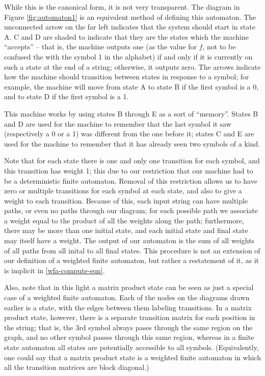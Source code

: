 \documentclass[12pt]{amsbook}
\theoremstyle{plain}
\theoremstyle{definition}
\theoremstyle{remark}
\begin{document}
While this is the canonical form, it is not very transparent.  The diagram in Figure \ref{fig:automaton1} is an equivalent method of defining this automaton.  The unconnected arrow on the far left indicates that the system should start in state A.  C and D are shaded to indicate that they are the states which the machine ``accepts'' -- that is, the machine outputs one (as the value for $f$, not to be confused the with the symbol 1 in the alphabet) if and only if it is currently on such a state at the end of a string;  otherwise, it outputs zero.  The arrows indicate how the machine should transition between states in response to a symbol;  for example, the machine will move from state A to state B if the first symbol is a 0, and to state D if the first symbol is a 1.

This machine works by using states B through E as a sort of ``memory''.  States B and D are used for the machine to remember that the last symbol it saw (respectively a 0 or a 1) was different from the one before it;  states C and E are used for the machine to remember that it has already seen two symbols of a kind.

Note that for each state there is one and only one transition for each symbol, and this transition has weight 1;  this due to our restriction that our machine had to be a deterministic finite automaton.  Removal of this restriction allows us to have zero or multiple transitions for each symbol at each state, and also to give a weight to each transition.  Because of this, each input string can have multiple paths, or even no paths through our diagram;  for each possible path we associate a weight equal to the product of all the weights along the path;  furthermore, there may be more than one initial state, and each initial state and final state may itself have a weight.  The output of our automaton is the sum of all weights of all paths from all inital to all final states.  This procedure is not an extension of our definition of a weighted finite automaton, but rather a restatement of it, as it is implicit in \eqref{wfa-compute-eqn}.

Also, note that in this light a matrix product state can be seen as just a special case of a weighted finite automaton.  Each of the nodes on the diagrams drawn earlier is a state, with the edges between them labeling transitions.  In a matrix product state, however, there is a separate transition matrix for each position in the string; that is, the 3rd symbol always pases through the same region on the graph, and no other symbol passes through this same region, whereas in a finite state automaton all states are potentially accessible to all symbols.  (Equivalently, one could say that a matrix product state is a weighted finite automaton in which all the transition matrices are block diagonal.)
\end{document}
